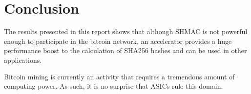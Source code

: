 \chapter{Conclusion}
\label{cha:conclusion}

The results presented in this report shows that although SHMAC is not powerful
enough to participate in the bitcoin network, an accelerator provides a huge
performance boost to the calculation of SHA256 hashes and can be used in other
applications.

Bitcoin mining is currently an activity that requires a tremendous amount of computing power.
As such, it is no surprise that ASICs rule this domain.

